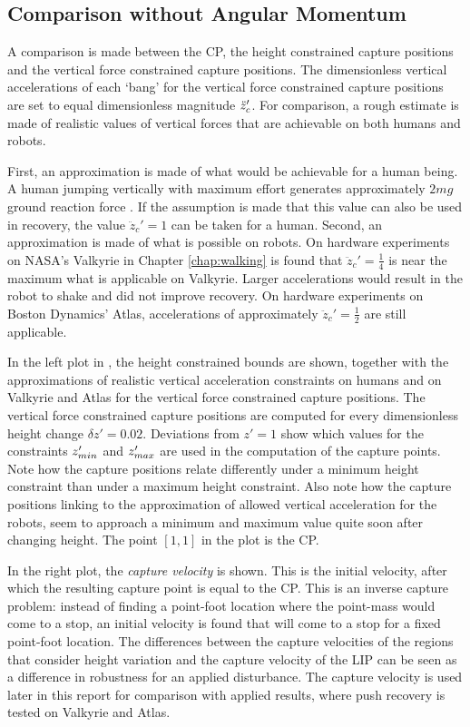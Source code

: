 \subsection{Comparison without Angular Momentum}\label{sec:capcomparenoinertia}
A comparison is made between the \ac{CP}, the height constrained capture positions and the vertical force constrained capture positions. The dimensionless vertical accelerations of each `bang' for the vertical force constrained capture positions are set to equal dimensionless magnitude $\ddot{z}_{c}'$. For comparison, a rough estimate is made of realistic values of vertical forces that are achievable on both humans and robots.

First, an approximation is made of what would be achievable for a human being. A human jumping vertically with maximum effort generates approximately $2mg$ ground reaction force \cite{linthorne2001analysis}. If the assumption is made that this value can also be used in recovery, the value $\ddot{z}_c'=1$ can be taken for a human. Second, an approximation is made of what is possible on robots. On hardware experiments on NASA's Valkyrie in Chapter \ref{chap:walking} is found that $\ddot{z}_c'=\frac{1}{4}$ is near the maximum what is applicable on Valkyrie. Larger accelerations would result in the robot to shake and did not improve recovery. On hardware experiments on Boston Dynamics' Atlas, accelerations of approximately $\ddot{z}_c'=\frac{1}{2}$ are still applicable.

In the left plot in , the height constrained bounds are shown, together with the approximations of realistic vertical acceleration constraints on humans and on Valkyrie and Atlas for the vertical force constrained capture positions. The vertical force constrained capture positions are computed for every dimensionless height change $\delta z'=0.02$. Deviations from $z'=1$ show which values for the constraints $z_{min}'$ and $z_{max}'$ are used in the computation of the capture points. Note how the capture positions relate differently under a minimum height constraint than under a maximum height constraint. Also note how the capture positions linking to the approximation of allowed vertical acceleration for the robots, seem to approach a minimum and maximum value quite soon after changing height. The point $[1,1]$ in the plot is the \ac{CP}. 

In the right plot, the \textit{capture velocity} is shown. This is the initial velocity, after which the resulting capture point is equal to the \ac{CP}. This is an inverse capture problem: instead of finding a point-foot location where the point-mass would come to a stop, an initial velocity is found that will come to a stop for a fixed point-foot location. The differences between the capture velocities of the regions that consider height variation and the capture velocity of the \ac{LIP} can be seen as a difference in robustness for an applied disturbance. The capture velocity is used later in this report for comparison with applied results, where push recovery is tested on Valkyrie and Atlas.

